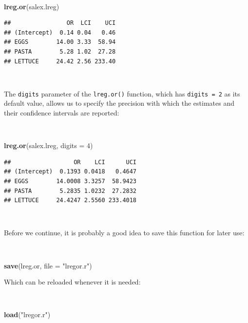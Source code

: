 \documentclass[12pt,a4paper]{book}
\newenvironment{Shaded}{\begin{snugshade}}{\end{snugshade}}
\newcommand{\DataTypeTok}[1]{\textcolor[rgb]{0.13,0.29,0.53}{#1}}
\newcommand{\DecValTok}[1]{\textcolor[rgb]{0.00,0.00,0.81}{#1}}
\newcommand{\KeywordTok}[1]{\textcolor[rgb]{0.13,0.29,0.53}{\textbf{#1}}}
\newcommand{\NormalTok}[1]{#1}
\newcommand{\StringTok}[1]{\textcolor[rgb]{0.31,0.60,0.02}{#1}}
\theoremstyle{definition}
\theoremstyle{definition}
\theoremstyle{definition}
\theoremstyle{remark}
\begin{document}
~

\begin{Shaded}
\begin{Highlighting}[]
\KeywordTok{lreg.or}\NormalTok{(salex.lreg)}
\end{Highlighting}
\end{Shaded}

\begin{verbatim}
##                OR  LCI    UCI
## (Intercept)  0.14 0.04   0.46
## EGGS        14.00 3.33  58.94
## PASTA        5.28 1.02  27.28
## LETTUCE     24.42 2.56 233.40
\end{verbatim}

~

The \texttt{digits} parameter of the \texttt{lreg.or()} function, which
has \texttt{digits\ =\ 2} as its default value, allows us to specify the
precision with which the estimates and their confidence intervals are
reported:

~

\begin{Shaded}
\begin{Highlighting}[]
\KeywordTok{lreg.or}\NormalTok{(salex.lreg, }\DataTypeTok{digits =} \DecValTok{4}\NormalTok{)}
\end{Highlighting}
\end{Shaded}

\begin{verbatim}
##                  OR    LCI      UCI
## (Intercept)  0.1393 0.0418   0.4647
## EGGS        14.0008 3.3257  58.9423
## PASTA        5.2835 1.0232  27.2832
## LETTUCE     24.4247 2.5560 233.4018
\end{verbatim}

~

Before we continue, it is probably a good idea to save this function for
later use:

~

\begin{Shaded}
\begin{Highlighting}[]
\KeywordTok{save}\NormalTok{(lreg.or, }\DataTypeTok{file =} \StringTok{"lregor.r"}\NormalTok{)}
\end{Highlighting}
\end{Shaded}

\newpage

Which can be reloaded whenever it is needed:

~

\begin{Shaded}
\begin{Highlighting}[]
\KeywordTok{load}\NormalTok{(}\StringTok{"lregor.r"}\NormalTok{)}
\end{Highlighting}
\end{Shaded}
\end{document}
